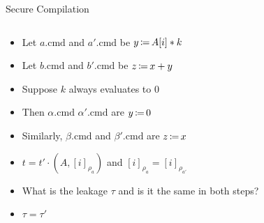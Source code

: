 \begin{frame}{Secure Compilation}
\begin{columns}
    \begin{column}{.5\textwidth}
        \begin{itemize}
            \item<+-> Let $a.\mathrm{cmd}$ and $a'.\mathrm{cmd}$
            be $y \operatorname{\coloneqq} A[i] * k$
            
            \item<+-> Let $b.\mathrm{cmd}$ and $b'.\mathrm{cmd}$ 
            be $z \operatorname{\coloneqq} x + y$
            
            \item<+-> Suppose $k$ always evaluates to $0$
            
            \item<+-> Then $\alpha.\mathrm{cmd}$ $\alpha'.\mathrm{cmd}$ 
            are $y \operatorname{\coloneqq} 0$
            
            \item<+-> Similarly, $\beta.\mathrm{cmd}$ and 
            $\beta'.\mathrm{cmd}$ are $z \operatorname{\coloneqq} x$
            
            \item<+-> $
                t = t' \cdot \left(A, [i]_{\rho_a}\right)
            $ and
            $
                [i]_{\rho_{a}} = [i]_{\rho_{a'}}
            $
            
            \item<+-> What is the leakage $\tau$ and is it the same
            in both steps?
            
            \item<+-> $\tau = \tau'$
        \end{itemize}
    \end{column}
    \begin{column}{.5\textwidth}
            {}
    \end{column}
\end{columns}
\end{frame}